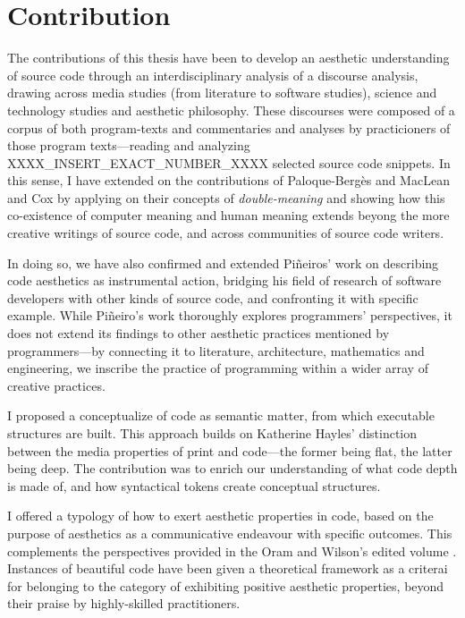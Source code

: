 \section{Contribution}  %


The contributions of this thesis have been to develop an aesthetic understanding of source code through an interdisciplinary analysis of a discourse analysis, drawing across media studies (from literature to software studies), science and technology studies and aesthetic philosophy. These discourses were composed of a corpus of both program-texts and commentaries and analyses by practicioners of those program texts—reading and analyzing  XXXX_INSERT_EXACT_NUMBER_XXXX selected source code snippets. In this sense, I have extended on the contributions of Paloque-Bergès and MacLean and Cox by applying on their concepts of \emph{double-meaning} and showing how this co-existence of computer meaning and human meaning extends beyong the more creative writings of source code, and across communities of source code writers.

In doing so, we have also confirmed and extended Piñeiros' work on describing code aesthetics as instrumental action, bridging his field of research of software developers with other kinds of source code, and confronting it with specific example. While Piñeiro's work thoroughly explores programmers' perspectives, it does not extend its findings to other aesthetic practices mentioned by programmers—by connecting it to literature, architecture, mathematics and engineering, we inscribe the practice of programming within a wider array of creative practices.

I proposed a conceptualize of code as semantic matter, from which executable structures are built. This approach builds on Katherine Hayles' distinction between the media properties of print and code—the former being flat, the latter being deep. The contribution was to enrich our understanding of what code depth is made of, and how syntactical tokens create conceptual structures.

I offered a typology of how to exert aesthetic properties in code, based on the purpose of aesthetics as a communicative endeavour with specific outcomes. This complements the perspectives provided in the Oram and Wilson's edited volume \citep{oram_beautiful_2007}. Instances of beautiful code have been given a theoretical framework as a criterai for belonging to the category of exhibiting positive aesthetic properties, beyond their praise by highly-skilled practitioners.

